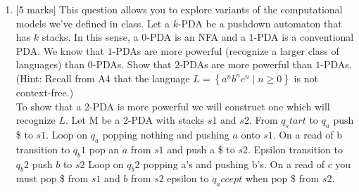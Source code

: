 \documentclass{article}
\newcommand{\set}[1]{{\left\{#1\right\}}}    %
\begin{document}
\begin{enumerate}
    \item {[5 marks]} This question allows you to explore variants of the computational models we've defined in class. Let a $k$-PDA be a pushdown automaton that has $k$ stacks. In this sense, a $0$-PDA is an NFA and a $1$-PDA is a conventional PDA. We know that $1$-PDAs are more powerful (recognize a larger class of languages) than $0$-PDAs. Show that $2$-PDAs are more powerful than $1$-PDAs. (Hint: Recall from A4 that the language $L=\set{a^nb^nc^n\mid n\geq 0}$ is not context-free.)\\
    To show that a 2-PDA is more powerful we will construct one which will recognize $L$. Let M be a 2-PDA with stacks $s1$ and $s2$. From $q_start$ to $q_a$ push \$ to $s1$. Loop on $q_a$ popping nothing and pushing $a$ onto $s1$. On a read of b transition to $q_b1$ pop an $a$ from $s1$ and push a \$ to $s2$. Epsilon transition to $q_b2$ push $b$ to $s2$ Loop on $q_b2$ popping a's and pushing b's. On a read of $c$ you must pop \$ from $s1$ and $b$ from $s2$ epsilon to $q_accept$ when pop \$ from $s2$.  
\end{enumerate}
\end{document}
